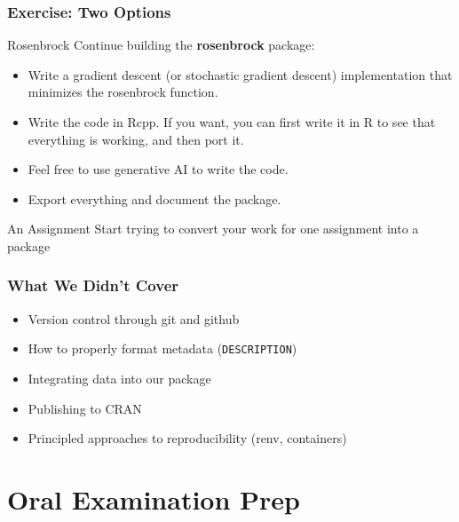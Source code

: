\documentclass[aspectratio=1610,onlytextwidth]{beamer}
\begin{document}
\begin{frame}[c]
  \frametitle{Exercise: Two Options}

  \begin{block}{Rosenbrock}
    Continue building the \textbf{rosenbrock} package:
    \begin{itemize}[<+->]
      \item Write a gradient descent (or stochastic gradient descent) implementation that
            minimizes the rosenbrock function.
      \item Write the code in Rcpp. If you want, you can first write it in R to
            see that everything is working, and then port it.
      \item Feel free to use generative AI to write the code.
      \item Export everything and document the package.
    \end{itemize}
  \end{block}

  \pause

  \begin{block}{An Assignment}
    Start trying to convert your work for one assignment into a package
  \end{block}
\end{frame}

\begin{frame}[c]
  \frametitle{What We Didn't Cover}

  \begin{itemize}[<+->]
    \item Version control through git and github
    \item How to properly format metadata (\texttt{DESCRIPTION})
    \item Integrating data into our package
    \item Publishing to CRAN
    \item Principled approaches to reproducibility (renv, containers)
  \end{itemize}

\end{frame}

\section{Oral Examination Prep}
\end{document}
